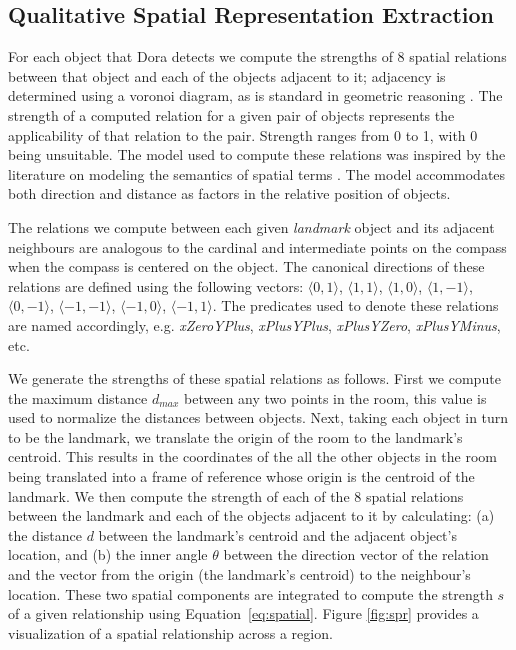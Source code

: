 \subsection{Qualitative Spatial Representation Extraction}

For each object that Dora detects we compute the strengths of 8 spatial relations between that object and each of the objects adjacent to it; adjacency is determined using a voronoi diagram, as is standard in geometric reasoning \cite{Forbus/etal2003}. The strength of a computed relation for a given pair of objects represents the applicability of that relation to the pair.  Strength ranges from 0 to 1, with 0 being unsuitable. The model used to compute these relations was inspired by the literature on modeling the semantics of spatial terms \cite{kelleher/costello:09,kelleher/vanGenabith:2006,regier/carlson:2001,gapp:1994}. The model accommodates both direction and distance as factors in the relative position of objects.

The relations we compute between each given \emph{landmark} object and its adjacent neighbours are analogous to the cardinal and intermediate points on the compass when the compass is centered on the object. The canonical directions of these relations are defined using the following vectors: $\langle0,1\rangle$, $\langle1,1\rangle$, $\langle1,0\rangle$, $\langle1,-1\rangle$, $\langle0,-1\rangle$, $\langle-1,-1\rangle$, $\langle-1,0\rangle$, $\langle-1,1\rangle$. The predicates used to denote these relations are named accordingly, e.g. \textit{xZeroYPlus}, \textit{xPlusYPlus}, \textit{xPlusYZero}, \textit{xPlusYMinus}, etc.

We generate the strengths of these spatial relations as follows. First we compute the maximum distance $d_{max}$ between any two points in the room, this value is used to normalize the distances between objects. Next, taking each object in turn to be the landmark, we translate the origin of the room to the landmark's centroid. This results in the coordinates of the all the other objects in the room being translated into a frame of reference whose origin is the centroid of the landmark.  We then compute the strength of each of the 8 spatial relations between the landmark and each of the objects adjacent to it by calculating: (a) the distance $d$ between the landmark's centroid and the adjacent object's location, and (b) the inner angle $\theta$ between the direction vector of the relation and the vector from the origin (the landmark's centroid) to the neighbour's location. These two spatial components are integrated to compute the strength $s$ of a given relationship using Equation~\ref{eq:spatial}. Figure \ref{fig:spr} provides a visualization of a spatial relationship across a region. 


